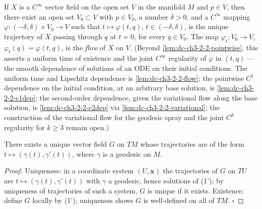 \begin{theorem}
  \label{thm:dc-ch3-2-2}
  If $X$ is a $C^\infty$ vector field on the open set $V$ in the manifold $M$ and
  $p\in V$, then there exist an open set $V_0\subset V$ with $p\in V_0$, a number
  $\delta>0$, and a $C^\infty$ mapping $\varphi:(-\delta,\delta)\times V_0\to V$ such
  that $t\mapsto\varphi(t,q)$, $t\in(-\delta,\delta)$, is the unique trajectory of
  $X$ passing through $q$ at $t=0$, for every $q\in V_0$. The map
  $\varphi_t:V_0\to V$, $\varphi_t(q)=\varphi(t,q)$, is the \emph{flow} of $X$ on $V$.
  (Beyond \cref{lem:dc-ch3-2-2-pointwise}, this asserts a uniform time of
  existence and the joint $C^\infty$ regularity of $\varphi$ in $(t,q)$ — the
  smooth dependence of solutions of an ODE on their initial conditions. The
  uniform time and Lipschitz dependence is \cref{lem:dc-ch3-2-2-flow}; the
  pointwise $C^1$ dependence on the initial condition, at an arbitrary base
  solution, is \cref{lem:dc-ch3-2-2-c1dep}; the second-order dependence, given
  the variational flow along the base solution, is \cref{lem:dc-ch3-2-2-c2dep}
  via \cref{lem:dc-ch3-2-2-variational}; the construction of the variational
  flow for the geodesic spray and the joint $C^k$ regularity for $k \ge 3$
  remain open.)
\end{theorem}

\begin{lemma}
  \label{lem:dc-ch3-2-3}
  There exists a unique vector field $G$ on $TM$ whose trajectories are of the form
  $t\mapsto(\gamma(t),\gamma'(t))$, where $\gamma$ is a geodesic on $M$.
\end{lemma}
\begin{proof}
  Uniqueness: in a coordinate system $(U,\mathbf{x})$ the trajectories of
  $G$ on $TU$ are $t\mapsto(\gamma(t),\gamma'(t))$ with $\gamma$ a geodesic, hence
  solutions of (1'); by uniqueness of trajectories of such a system, $G$ is unique
  if it exists. Existence: define $G$ locally by (1'); uniqueness shows $G$ is
  well-defined on all of $TM$. $\square$
\end{proof}

